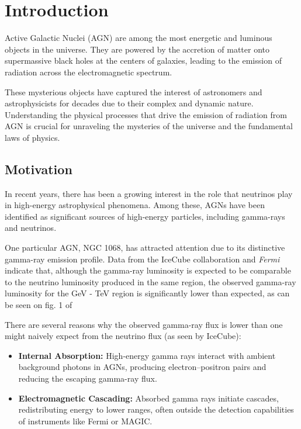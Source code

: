 \chapter{Introduction}
\label{chap:Introduction}

Active Galactic Nuclei (AGN) are among the most energetic and luminous objects in the universe. They are powered by the accretion of matter onto supermassive black holes at the centers of galaxies, leading to the emission of radiation across the electromagnetic spectrum. 

These mysterious objects have captured the interest of astronomers and astrophysicists for decades due to their complex and dynamic nature. Understanding the physical processes that drive the emission of radiation from AGN is crucial for unraveling the mysteries of the universe and the fundamental laws of physics.

\section{Motivation}

In recent years, there has been a growing interest in the role that neutrinos play in high-energy astrophysical phenomena. Among these, AGNs have been identified as significant sources of high-energy particles, including gamma-rays and neutrinos. 

One particular AGN, NGC 1068, has attracted attention due to its distinctive gamma-ray emission profile. Data from the IceCube collaboration \citep{IceCube2022} and \textit{Fermi} indicate that, although the gamma-ray luminosity is expected to be comparable to the neutrino luminosity produced in the same region, the observed gamma-ray luminosity for the GeV - TeV region is significantly lower than expected, as can be seen on fig. 1 of \citet{padovani2024highenergyneutrinosvicinitysupermassive}

There are several reasons why the observed gamma-ray flux is lower than one might naively expect from the neutrino flux (as seen by IceCube):

\newpage

\begin{itemize}
    \item \textbf{Internal Absorption:} High-energy gamma rays interact with ambient background photons in AGNs, producing electron–positron pairs and reducing the escaping gamma-ray flux.
    \item \textbf{Electromagnetic Cascading:} Absorbed gamma rays initiate cascades, redistributing energy to lower ranges, often outside the detection capabilities of instruments like Fermi or MAGIC.
\end{itemize}

